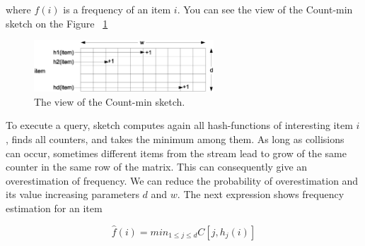 where $f(i)$ is a frequency of an item $i$.
You can see the view of the Count-min sketch on the Figure ~\ref{fig:count_min_sketch}

\begin{figure}[h]
  \centering
  \includegraphics [width=0.6\textwidth]{images/CountMinSketch}
  \caption{The view of the Count-min sketch.}
  \label{fig:count_min_sketch}
\end{figure}

To execute a query, sketch computes again all hash-functions of interesting item $i$, finds all counters, and takes the minimum among them.
As long as collisions can occur, sometimes different items from the stream lead to grow of the same counter in the same row of the matrix.
This can consequently give an overestimation of frequency.
We can reduce the probability of overestimation and its value increasing parameters $d$ and $w$.
The next expression shows frequency estimation for an item

$$
\hat{f}(i) = min_{1 \leq j \leq d}C[j,h_j(i)]
$$




